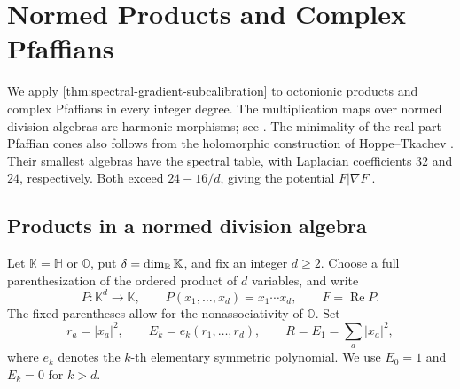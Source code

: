 \section{Normed Products and Complex Pfaffians}
\label{sec:norm-products-pfaffians}

We apply \cref{thm:spectral-gradient-subcalibration} to octonionic products
and complex Pfaffians in every integer degree.
The multiplication maps over normed division algebras are harmonic morphisms; see
\cite[Section~4.5.2]{RiedlerThesis25}. The minimality of the real-part
Pfaffian cones also follows from the holomorphic construction of
Hoppe--Tkachev \cite[Corollary~5.2 and Remark~5.5]{HoppeTkachev19}.
Their smallest algebras have the spectral table, with Laplacian
coefficients \(32\) and \(24\), respectively. Both exceed
\(24-16/d\), giving the potential \(F|\nabla F|\).

\subsection{Products in a normed division algebra}

Let \(\mathbb K=\mathbb H\) or \(\mathbb O\), put
\(\delta=\dim_{\mathbb R}\mathbb K\), and fix an integer \(d\ge2\).
Choose a full parenthesization of the ordered product of \(d\)
variables, and write
\begin{equation}\label{eq:norm-product-definition}
 P:\mathbb K^d\longrightarrow\mathbb K,
 \qquad P(x_1,\ldots,x_d)=x_1\cdots x_d,
 \qquad F=\operatorname{Re}P.
\end{equation}
The fixed parentheses allow for the nonassociativity of
\(\mathbb O\). Set
\begin{equation}\label{eq:norm-product-generators}
 r_a=|x_a|^2,\qquad E_k=e_k(r_1,\ldots,r_d),\qquad
 R=E_1=\sum_a|x_a|^2,
\end{equation}
where \(e_k\) denotes the \(k\)-th elementary symmetric polynomial.
We use \(E_0=1\) and \(E_k=0\) for \(k>d\).

